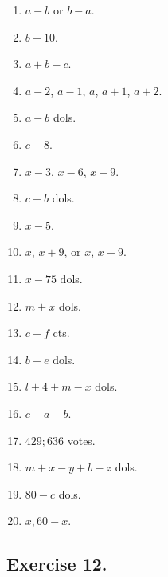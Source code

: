 \documentclass{book}
\begin{document}
\begin{enumerate}
\item $a - b$ or $b - a$.

\item $b - 10$.

\item $a + b - c$.

\item $a -2$, $a - 1$, $a$, $a + 1$, $a + 2$.

\item $a - b$ dols.

\item $c - 8$.

\item $x - 3$, $x - 6$, $x - 9$.

\item $c - b$ dols.

\item $x - 5$.

\item $x$, $x + 9$, or $x$, $x - 9$.

\item $x - 75$ dols.

\item $m + x$ dols.

\item $c - f$ cts.

\item $b - e$ dols.

\item $l + 4 + m - x$ dols.

\item $c - a - b$.

\item $429; 636$ votes.

\item $m + x - y + b - z$ dols.

\item $80 - c$ dols.

\item $x, 60 - x$.
\end{enumerate}

\subsection*{Exercise 12.}
\end{document}
